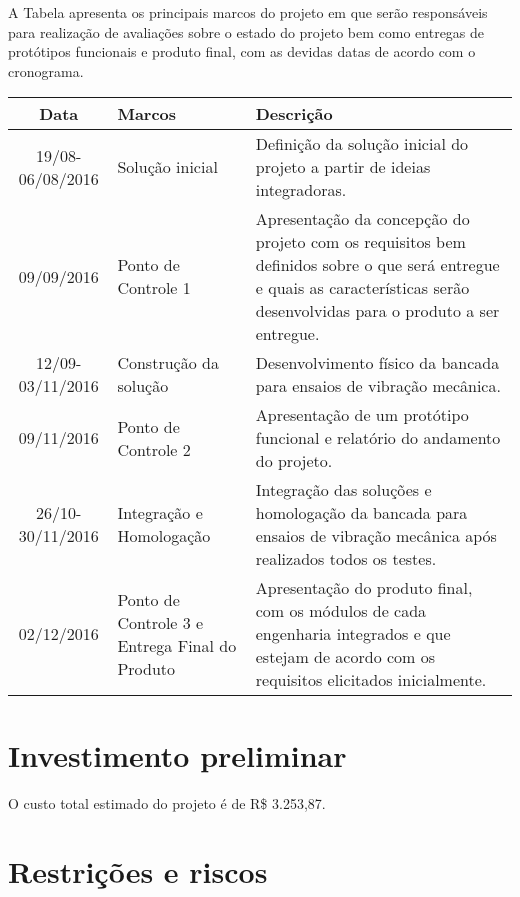 	A Tabela \label{tab:cronograma_marcos} apresenta os principais marcos do projeto em que serão responsáveis para realização
    de avaliações sobre o estado do projeto bem como entregas de protótipos funcionais e produto final,
    com as devidas datas de acordo com o cronograma.

  \begin{table}[h]
  \centering
  \label{tab:cronograma_marcos}
  \begin{tabular}{|c|p{4.5cm}|p{8cm}|}
	\hline
  Data & Marcos & Descrição\\
  \hline                               
  19/08-06/08/2016 & Solução inicial & Definição da solução inicial do projeto a partir de ideias integradoras.\\
  \hline                               
  09/09/2016 & Ponto de Controle 1 & Apresentação da concepção do projeto com os requisitos bem definidos 
  									sobre o que será entregue e quais as características serão 												desenvolvidas para o produto a ser entregue.\\
  \hline                               
  12/09-03/11/2016 & Construção da solução & Desenvolvimento físico da bancada para ensaios de vibração mecânica.\\
  \hline                               
  09/11/2016 & Ponto de Controle 2 & Apresentação de um protótipo funcional e relatório do 
  									andamento do projeto.\\
  \hline                               
  26/10-30/11/2016 & Integração e Homologação & Integração das soluções e homologação da bancada para ensaios de vibração mecânica após realizados todos os testes.\\
  \hline
  02/12/2016 & Ponto de Controle 3 e Entrega Final do Produto & Apresentação do produto final, com os módulos 																	de cada engenharia integrados e que 																	estejam de acordo com os requisitos 																	elicitados inicialmente.\\
  \hline
  \end{tabular}
  \end{table}


\section*{Investimento preliminar}

	O custo total estimado do projeto é de R\$ 3.253,87.

\section*{Restrições e riscos}
	
